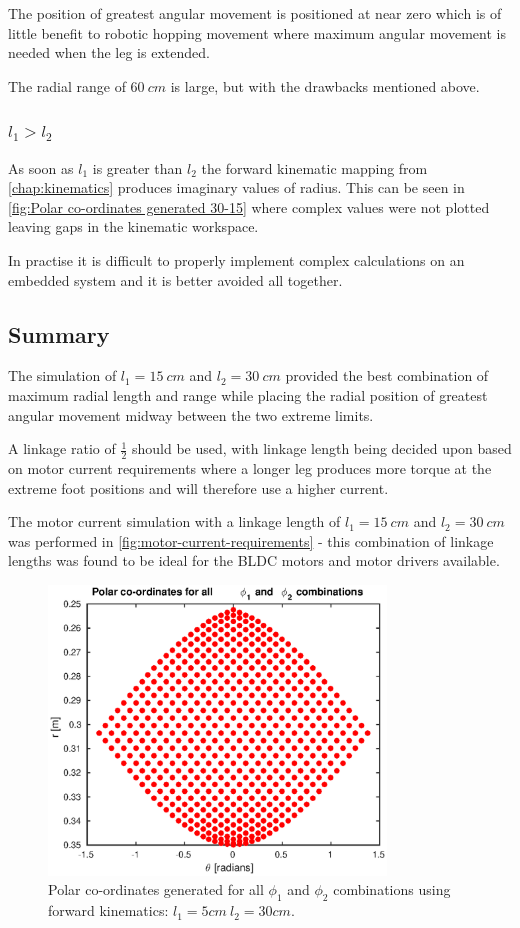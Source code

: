 The position of greatest angular movement is positioned at near zero which is of little benefit to robotic hopping movement where maximum angular movement is needed when the leg is extended.

The radial range of $60\ cm$ is large, but with the drawbacks mentioned above.

\subsubsection{$l_1>l_2$}
As soon as $l_1$ is greater than $l_2$ the forward kinematic mapping from \cref{chap:kinematics} produces imaginary values of radius. This can be seen in \cref{fig:Polar co-ordinates generated 30-15} where complex values were not plotted leaving gaps in the kinematic workspace. 

In practise it is difficult to properly implement complex calculations on an embedded system and it is better avoided all together. 

\subsection{Summary}
The simulation of $l_1=15\ cm$ and $l_2=30\ cm$ provided the best combination of maximum radial length and range while placing the radial position of greatest angular movement midway between the two extreme limits. 

A linkage ratio of $\frac{1}{2}$ should be used, with linkage length being decided upon based on motor current requirements where a longer leg produces more torque at the extreme foot positions and will therefore use a higher current. 

The motor current simulation with a linkage length of $l_1=15\ cm$ and $l_2=30\ cm$ was performed in \cref{fig:motor-current-requirements} - this combination of linkage lengths was found to be ideal for the BLDC motors and motor drivers available.

\begin{figure}
\centering
\includegraphics[width=0.8\textwidth]{images/geometry/forward-kinematic-leg-positions-5-30.eps}
\caption{Polar co-ordinates generated for all $\phi_1$ and $\phi_2$ combinations using forward kinematics: $l_1 = 5cm\ l_2 = 30cm$.}
\label{fig:Polar co-ordinates generated 5-30}
\end{figure}

